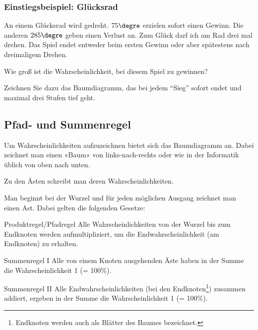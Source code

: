 
\subsubsection{Einstiegsbeispiel: Glücksrad}
An einem Glücksrad wird gedreht. $75\degre$ erzielen sofort einen Gewinn. Die anderen $285\degre$ geben einen Verlust an. Zum Glück darf ich am Rad drei mal drehen. Das Spiel endet entweder beim ersten Gewinn oder aber spätestens nach dreimaligem Drehen.

Wie groß ist die Wahrscheinlichkeit, bei diesem Spiel zu gewinnen?

Zeichnen Sie dazu das Baumdiagramm, das bei jedem ``Sieg'' sofort endet und
maximal drei Stufen tief geht.



\newpage

\subsection{Pfad- und Summenregel}
Um Wahrscheinlichkeiten aufzuzeichnen bietet sich das Baumdiagramm an.
Dabei zeichnet man einen «Baum» von links-nach-rechts oder wie in der Informatik üblich von oben nach unten.

Zu den Ästen schreibt man deren Wahrscheinlichkeiten.

Man beginnt bei der Wurzel und für jeden möglichen Ausgang zeichnet man einen Ast. Dabei gelten die folgenden Gesetze:



\begin{gesetz}{Produktregel/Pfadregel}{}
Alle Wahrscheinlichkeiten von der Wurzel bis zum Endknoten werden aufmultipliziert, um die Endwahrscheinlichkeit (am Endknoten) zu erhalten.
\end{gesetz}

\begin{gesetz}{Summenregel I}{}
Alle von einem Knoten ausgehenden Äste haben in der Summe die Wahrscheinlichkeit 1 (= 100\%).
\end{gesetz}

\begin{gesetz}{Summenregel II}{}
Alle Endwahrscheinlichkeiten (bei den Endknoten\footnote{Endknoten werden auch als Blätter des Baumes bezeichnet.}) zusammen addiert, ergeben in der Summe die Wahrscheinlichkeit 1 (= 100\%).
\end{gesetz}

